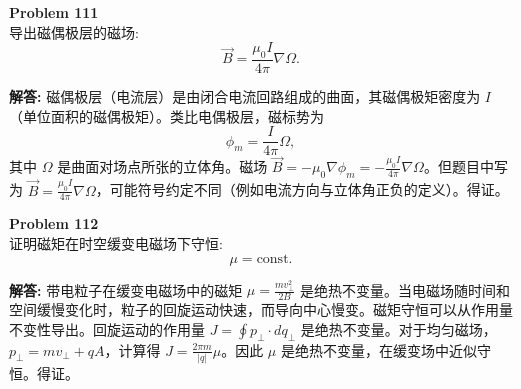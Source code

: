 \documentclass[12pt, a4paper, oneside]{ctexart}
\newenvironment{solution}{\par\noindent\textbf{解答:}\quad}{\par}
\begin{document}
\begin{mdframed}[backgroundcolor=gray!10, linewidth=0pt]
    \textbf{Problem 111} \\
    导出磁偶极层的磁场:
    \[
    \vec{B} = \frac{\mu_0 I}{4\pi} \nabla \Omega.
    \]
\end{mdframed}
\begin{solution}
    磁偶极层（电流层）是由闭合电流回路组成的曲面，其磁偶极矩密度为 $I$（单位面积的磁偶极矩）。类比电偶极层，磁标势为
    \[
    \phi_m = \frac{I}{4\pi} \Omega,
    \]
    其中 $\Omega$ 是曲面对场点所张的立体角。磁场 $\vec{B} = -\mu_0 \nabla \phi_m = -\frac{\mu_0 I}{4\pi} \nabla \Omega$。但题目中写为 $\vec{B} = \frac{\mu_0 I}{4\pi} \nabla \Omega$，可能符号约定不同（例如电流方向与立体角正负的定义）。得证。
\end{solution}

\begin{mdframed}[backgroundcolor=gray!10, linewidth=0pt]
    \textbf{Problem 112} \\
    证明磁矩在时空缓变电磁场下守恒:
    \[
    \mu = \text{const.}
    \]
\end{mdframed}
\begin{solution}
    带电粒子在缓变电磁场中的磁矩 $\mu = \frac{m v_\perp^2}{2B}$ 是绝热不变量。当电磁场随时间和空间缓慢变化时，粒子的回旋运动快速，而导向中心慢变。磁矩守恒可以从作用量不变性导出。回旋运动的作用量 $J = \oint p_\perp \cdot dq_\perp$ 是绝热不变量。对于均匀磁场，$p_\perp = m v_\perp + q A$，计算得 $J = \frac{2\pi m}{|q|} \mu$。因此 $\mu$ 是绝热不变量，在缓变场中近似守恒。得证。
\end{solution}
\end{document}
